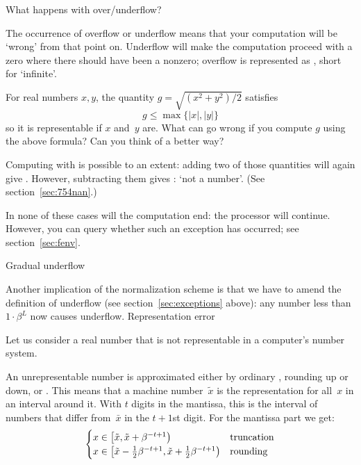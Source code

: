 {What happens with over/underflow?}

The occurrence of overflow or underflow means that your computation
will be `wrong' from that point on. Underflow will make the computation
proceed with a zero where there should have been a nonzero;
overflow is represented as , short for `infinite'.

\begin{exercise}
For real numbers $x,y$, the quantity $g=\sqrt{(x^2+y^2)/2}$ satisfies
\begin{equation}
  g\leq \max\{|x|,|y|\}
\end{equation}
so it is representable if $x$ and~$y$ are.
What can go wrong if you compute $g$ using the above formula?
Can you think of a better way?
\end{exercise}


Computing with  is possible to an extent: adding two of those
quantities will again give . However, subtracting them gives
: `not a number'.
(See section~\ref{sec:754nan}.)

In none of these cases will the computation end:
the processor will continue.
However, you can query whether such an exception has occurred;
see section~\ref{sec:fenv}.


 {Gradual underflow}
\label{sec:754underflow}

Another implication of the normalization scheme is that we have to amend the
definition of underflow (see section~\ref{sec:exceptions} above):
any number less than $1\cdot\beta^L$ now causes underflow.
%
 {Representation error}

Let us consider a real number that is not representable in a
computer's number system.

An unrepresentable number is approximated either by
ordinary , rounding up or down, or .
This means that a machine number~$\tilde x$ is the representation for
all~$x$ in an interval around it.  With $t$ digits in the
mantissa, this is the interval of numbers that differ
from~$\bar x$ in the $t+1$st digit. For the mantissa
part we get:
\begin{equation}
\begin{cases}
  x\in \left[\tilde x,\tilde x+\beta^{-t+1}\right)&\hbox{truncation}\\
  x\in \left[\tilde x-\frac12 \beta^{-t+1},\tilde x+\frac12 \beta^{-t+1}\right)
    &\hbox{rounding}
\end{cases}
\end{equation}

